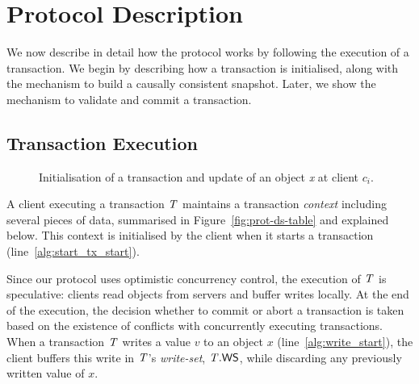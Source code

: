 \section{Protocol Description}

We now describe in detail how the protocol works by following the execution of a transaction. We begin by describing how a transaction is initialised, along with the mechanism to build a causally consistent snapshot. Later, we show the mechanism to validate and commit a transaction.

\subsection{Transaction Execution}

\begin{figure}[h]
\begin{algorithm}[H]
  \setcounter{AlgoLine}{0}

  \smallskip

\end{algorithm}
\caption{Initialisation of a transaction and update of an object \emph{x} at client $c_i$.}
\end{figure}

A client executing a transaction $\mathit{T}$ maintains a transaction \emph{context} including several pieces of data, summarised in Figure~\ref{fig:prot-ds-table} and explained below. This context is initialised by the client when it starts a transaction (line~\ref{alg:start_tx_start}).

Since our protocol uses optimistic concurrency control, the execution of $\mathit{T}$ is speculative: clients read objects from servers and buffer writes locally. At the end of the execution, the decision whether to commit or abort a transaction is taken based on the existence of conflicts with concurrently executing transactions. When a transaction $\mathit{T}$ writes a value $v$ to an object $x$ (line~\ref{alg:write_start}), the client buffers this write in $\mathit{T}$'s \emph{write-set}, $\mathit{T}.\mathsf{WS}$, while discarding any previously written value of $x$.

